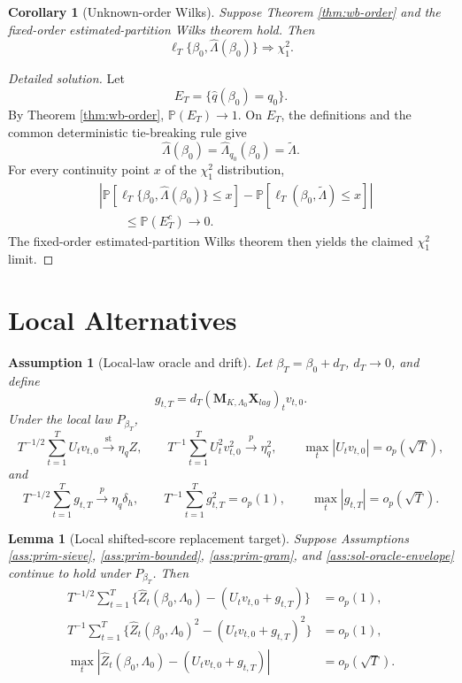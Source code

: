 \documentclass[12pt]{article}
\numberwithin{equation}{section}
\newtheorem{lemma}{Lemma}
\newtheorem{corollary}{Corollary}
\newtheorem{assumption}{Assumption}
\theoremstyle{definition}
\newcommand{\Pp}{\mathbb P}
\begin{document}
\begin{corollary}[Unknown-order Wilks]
\label{cor:wb-unknown-wilks}
Suppose Theorem \ref{thm:wb-order} and the fixed-order
estimated-partition Wilks theorem hold.  Then
\[
    \ell_T\{\beta_0,\widehat\Lambda(\beta_0)\}\Rightarrow\chi_1^2.
\]
\end{corollary}


\begin{proof}[Detailed solution]
Let
\[
    E_T=\{\widehat q(\beta_0)=q_0\}.
\]
By Theorem \ref{thm:wb-order}, \(\Pp(E_T)\to1\).  On \(E_T\), the definitions
and the common deterministic tie-breaking rule give
\[
    \widehat\Lambda(\beta_0)
    =\widehat\Lambda_{q_0}(\beta_0)
    =\widetilde\Lambda.
\]
For every continuity point \(x\) of the \(\chi_1^2\) distribution,
\begin{align*}
    &\left|
      \Pp\left[
        \ell_T\{\beta_0,\widehat\Lambda(\beta_0)\}\leq x
      \right]
      -\Pp\left[
        \ell_T(\beta_0,\widetilde\Lambda)\leq x
      \right]
    \right|\\
    &\qquad\leq \Pp(E_T^c)\to0.
\end{align*}
The fixed-order estimated-partition Wilks theorem then yields the claimed
\(\chi_1^2\) limit.
\end{proof}


\section{Local Alternatives}
\label{sec:local-alternatives}

\begin{assumption}[Local-law oracle and drift]
\label{ass:wb-local-oracle}
Let \(\beta_T=\beta_0+d_T\), \(d_T\to0\), and define
\[
    g_{t,T}=d_T(\bm M_{K,\Lambda_0}\bm X_{lag})_tv_{t,0}.
\]
Under the local law \(P_{\beta_T}\),
\[
    T^{-1/2}\sum_{t=1}^TU_tv_{t,0}\xrightarrow{\mathrm{st}}\eta_qZ,
    \qquad
    T^{-1}\sum_{t=1}^TU_t^2v_{t,0}^2\xrightarrow{p}\eta_q^2,
    \qquad
    \max_t|U_tv_{t,0}|=o_p(\sqrt T),
\]
and
\[
    T^{-1/2}\sum_{t=1}^Tg_{t,T}\xrightarrow{p}\eta_q\delta_h,
    \qquad
    T^{-1}\sum_{t=1}^Tg_{t,T}^2=o_p(1),
    \qquad
    \max_t|g_{t,T}|=o_p(\sqrt T).
\]
\end{assumption}

\begin{lemma}[Local shifted-score replacement target]
\label{lem:wb-local-replacement}
Suppose Assumptions \ref{ass:prim-sieve}, \ref{ass:prim-bounded},
\ref{ass:prim-gram}, and \ref{ass:sol-oracle-envelope} continue to hold under
\(P_{\beta_T}\).  Then
\begin{align}
    T^{-1/2}\sum_{t=1}^T
    \{\widehat Z_t(\beta_0,\Lambda_0)-(U_tv_{t,0}+g_{t,T})\}
    &=o_p(1),
    \\
    T^{-1}\sum_{t=1}^T
    \{\widehat Z_t(\beta_0,\Lambda_0)^2-(U_tv_{t,0}+g_{t,T})^2\}
    &=o_p(1),
    \\
    \max_t|\widehat Z_t(\beta_0,\Lambda_0)-(U_tv_{t,0}+g_{t,T})|
    &=o_p(\sqrt T).
\end{align}
\end{lemma}
\end{document}
